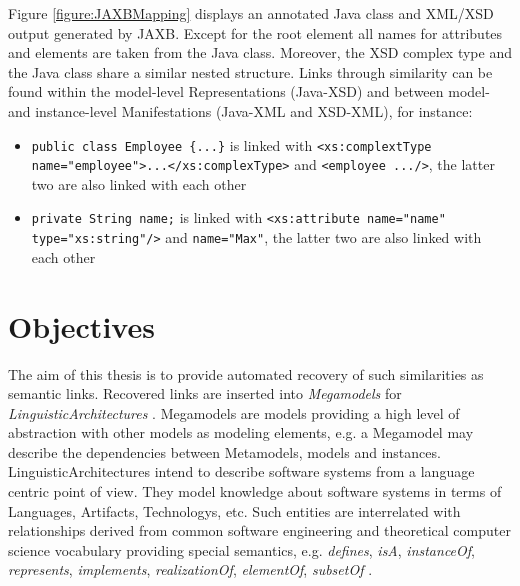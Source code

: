 Figure \ref{figure:JAXBMapping} displays an annotated \gls{Java} class and \gls{XML}/\gls{XSD} output generated by \gls{JAXB}.
Except for the root element all names for attributes and elements are taken from the \gls{Java} class.
Moreover, the \gls{XSD} complex type and the \gls{Java} class share a similar nested structure.
Links through similarity can be found within the model-level \glspl{Representation} (\gls{Java}-\gls{XSD}) and between model- and instance-level \glspl{Manifestation} (\gls{Java}-\gls{XML} and \gls{XSD}-\gls{XML}), for instance:
\begin{itemize}
\item
\texttt{public class Employee \{...\}} is linked with \texttt{<xs:complextType name="employee">...</xs:complexType>}
and \texttt{<employee .../>}, the latter two are also linked with each other

\item
\texttt{private String name;} is linked with \texttt{<xs:attribute name="name" type="xs:string"/>} and \texttt{name="Max"}, the latter two are also linked with each other
\end{itemize}


\section{Objectives}
\label{section:Objectives}

The aim of this thesis is to provide automated recovery of such similarities as semantic links.
Recovered links are inserted into \textit{\glspl{Megamodel}} \cite{DBLP:conf/sattose/BaggeZ14} \cite{DBLP:journals/entcs/FavreN05} for \textit{\glspl{LinguisticArchitecture}} \cite{DBLP:conf/models/FavreLV12} \cite{DBLP:conf/ecmdafa/LammelV14} \cite{HeinzLV17}.
\Glspl{Megamodel} are models providing a high level of abstraction with other models as modeling elements, e.g. a \gls{Megamodel} may describe the dependencies between \glspl{Metamodel}, models and instances.
\Glspl{LinguisticArchitecture} intend to describe software systems from a language centric point of view.
They model knowledge about software systems in terms of \glspl{Language}, \glspl{Artifact}, \glspl{Technology}, etc. \cite{LukasHaertelBScThesis} \cite{DBLP:conf/models/FavreLV12} \cite{DBLP:conf/ecmdafa/LammelV14}
Such entities are interrelated with relationships derived from common software engineering and theoretical computer science vocabulary providing special semantics, e.g. \textit{defines}, \textit{isA}, \textit{instanceOf}, \textit{represents}, \textit{implements}, \textit{realizationOf}, \textit{elementOf}, \textit{subsetOf} \cite{HeinzLV17}.

